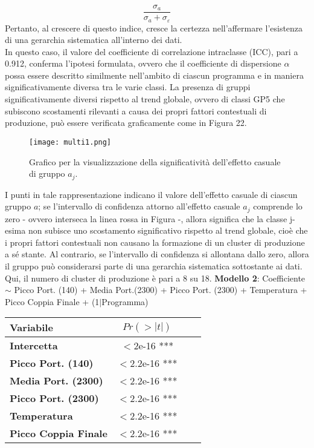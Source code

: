\documentclass[fleqn,10pt]{SelfArx} %
\begin{document}
\begin{equation}
    \frac{\sigma_a}{\sigma_a+\sigma_{\varepsilon}}
\end{equation}
Pertanto, al crescere di questo indice, cresce la certezza nell'affermare l'esistenza di una gerarchia sistematica all'interno dei dati.\\
In questo caso, il valore del coefficiente di correlazione intraclasse (ICC), pari a 0.912, conferma l'ipotesi formulata, ovvero che il coefficiente di dispersione $\alpha$ possa essere descritto similmente nell'ambito di ciascun programma e in maniera significativamente diversa tra le varie classi. La presenza di gruppi significativamente diversi rispetto al trend globale, ovvero di classi GP5 che subiscono scostamenti rilevanti a causa dei propri fattori contestuali di produzione, può essere verificata graficamente come in Figura 22.
\begin{figure}[H]
    \centering
    \texttt{[image: multi1.png]}
    \label{fig:em}
    \caption{Grafico per la visualizzazione della significatività dell'effetto casuale di gruppo $a_j$.}
\end{figure}
I punti in tale rappresentazione indicano il valore dell'effetto casuale di ciascun gruppo $a$; se l'intervallo di confidenza attorno all'effetto casuale $a_j$ comprende lo zero - ovvero interseca la linea rossa in Figura -, allora significa che la classe j-esima non subisce uno scostamento significativo rispetto al trend globale, cioè che i propri fattori contestuali non causano la formazione di un cluster di produzione a sé stante. Al contrario, se l'intervallo di confidenza si allontana dallo zero, allora il gruppo può considerarsi parte di una gerarchia sistematica sottostante ai dati. Qui, il numero di cluster di produzione è pari a 8 su 18.
\textbf{Modello 2}: Coefficiente $\sim$  Picco Port. (140) + Media Port.(2300) + Picco Port. (2300) + Temperatura + Picco Coppia Finale + (1$\mid$Programma)
{\begin{table}[h] 
\centering
\begin{tabular}[t]{lccc}
\toprule 
Variabile&$Pr(> |t|)$\\
\midrule 
\textbf{Intercetta}&$<$2e-16 ***&\\
\textbf{Picco Port. (140)}&$<$2.2e-16 ***\\ 
\textbf{Media Port. (2300)}&$<$2.2e-16 ***\\ 
\textbf{Picco Port. (2300)}&$<$2.2e-16 ***\\ 
\textbf{Temperatura}&$<$2.2e-16 ***\\
\textbf{Picco Coppia Finale}&$<$2.2e-16 ***\\
\bottomrule 
\end{tabular}
\end{table}}\\
\end{document}
